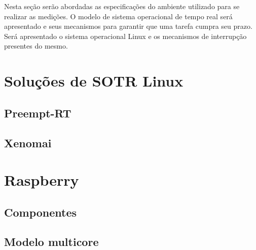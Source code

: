 
Nesta seção serão abordadas as especificações do ambiente utilizado para se realizar as medições. O modelo de sistema operacional de tempo real será apresentado e seus mecanismos para garantir que uma tarefa cumpra seu prazo. Será apresentado o sistema operacional Linux e os mecanismos de interrupção presentes do mesmo.

\section{Soluções de SOTR Linux}
\subsection{Preempt-RT}
\subsection{Xenomai}
\section{Raspberry}
\subsection{Componentes}
\subsection{Modelo multicore}
